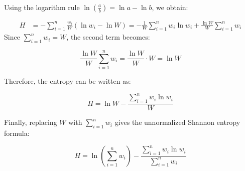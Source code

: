 \documentclass[main.tex]{subfiles}
\begin{document}
Using the logarithm rule $\ln\left(\frac{a}{b}\right) = \ln a - \ln b$, we obtain:

\begin{align}
    H &= - \sum_{i=1}^{n} \frac{w_i}{W} \left( \ln w_i - \ln W \right) = - \frac{1}{W} \sum_{i=1}^{n} w_i \ln w_i + \frac{\ln W}{W} \sum_{i=1}^{n} w_i
\end{align}
\clearpage
Since $\sum_{i=1}^{n} w_i = W$, the second term becomes:

\begin{equation}
    \frac{\ln W}{W} \sum_{i=1}^{n} w_i = \frac{\ln W}{W} \cdot W = \ln W
\end{equation}

Therefore, the entropy can be written as:

\begin{equation}
    H = \ln W - \frac{\sum_{i=1}^{n} w_i \ln w_i}{W}
\end{equation}

Finally, replacing $W$ with $\sum_{i=1}^{n} w_i$ gives the unnormalized Shannon entropy formula:

\begin{equation}
    H = \ln \left( \sum_{i=1}^{n} w_i \right) - \frac{\sum_{i=1}^{n} w_i \ln w_i}{\sum_{i=1}^{n} w_i}
\end{equation}
\end{document}
